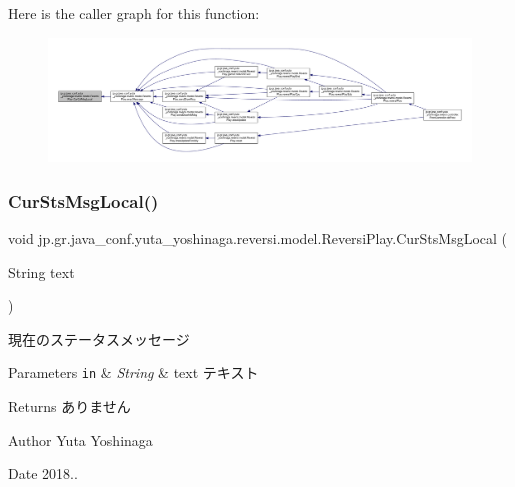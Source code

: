 Here is the caller graph for this function\+:
\nopagebreak
\begin{figure}[H]
\begin{center}
\leavevmode
\includegraphics[width=350pt]{classjp_1_1gr_1_1java__conf_1_1yuta__yoshinaga_1_1reversi_1_1model_1_1_reversi_play_a0dec187d4c4372a3470fac8e341ae9e8_icgraph}
\end{center}
\end{figure}
\mbox{\label{classjp_1_1gr_1_1java__conf_1_1yuta__yoshinaga_1_1reversi_1_1model_1_1_reversi_play_a4c4d14ddaf65d3643bd7edc7b562f4d1}} 
\subsubsection{\texorpdfstring{Cur\+Sts\+Msg\+Local()}{CurStsMsgLocal()}}
{\footnotesize\ttfamily void jp.\+gr.\+java\+\_\+conf.\+yuta\+\_\+yoshinaga.\+reversi.\+model.\+Reversi\+Play.\+Cur\+Sts\+Msg\+Local (\begin{DoxyParamCaption}\item[{String}]{text }\end{DoxyParamCaption})\hspace{0.3cm}{\ttfamily [private]}}



現在のステータスメッセージ 


\begin{DoxyParams}[1]{Parameters}
\mbox{\tt in}  & {\em String} & text テキスト \\
\hline
\end{DoxyParams}
\begin{DoxyReturn}{Returns}
ありません 
\end{DoxyReturn}
\begin{DoxyAuthor}{Author}
Yuta Yoshinaga 
\end{DoxyAuthor}
\begin{DoxyDate}{Date}
2018.. 
\end{DoxyDate}


